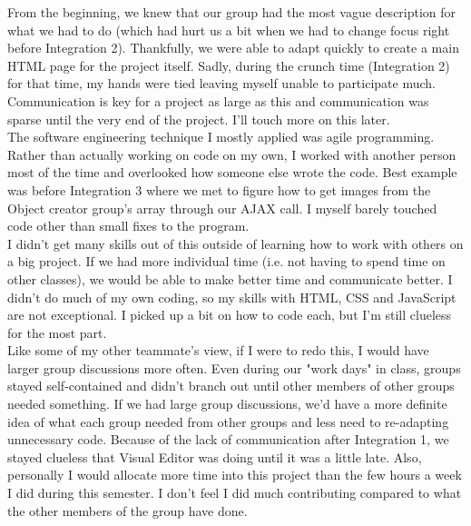 \documentclass[12pt]{article}
\begin{document}
From the beginning, we knew that our group had the most vague description for what we had to do (which had hurt us a bit when we had to change focus right before Integration 2).  Thankfully, we were able to adapt quickly to create a main HTML page for the project itself.  Sadly, during the crunch time (Integration 2) for that time, my hands were tied leaving myself unable to participate much. \\

Communication is key for a project as large as this and communication was sparse until the very end of the project.  I'll touch more on this later.  \\

The software engineering technique I mostly applied was agile programming.  Rather than actually working on code on my own, I worked with another person most of the time and overlooked how someone else wrote the code.  Best example was before Integration 3 where we met to figure how to get images from the Object creator group's array through our AJAX call.  I myself barely touched code other than small fixes to the program. \\

I didn't get many skills out of this outside of learning how to work with others on a big project.  If we had more individual time (i.e. not having to spend time on other classes), we would be able to make better time and communicate better.  I didn't do much of my own coding, so my skills with HTML, CSS and JavaScript are not exceptional.  I picked up a bit on how to code each, but I'm still clueless for the most part. \\

Like some of my other teammate's view, if I were to redo this, I would have larger group discussions more often.  Even during our "work days" in class, groups stayed self-contained and didn't branch out until other members of other groups needed something.  If we had large group discussions, we'd have a more definite idea of what each group needed from other groups and less need to re-adapting unnecessary code.  Because of the lack of communication after Integration 1, we stayed clueless that Visual Editor was doing until it was a little late.  Also, personally I would allocate more time into this project than the few hours a week I did during this semester.  I don't feel I did much contributing compared to what the other members of the group have done. \\

\end{document}
